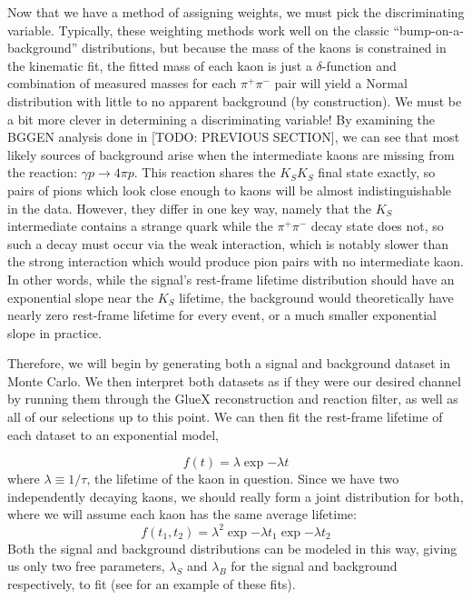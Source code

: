 Now that we have a method of assigning weights, we must pick the discriminating variable. Typically, these weighting methods work well on the classic ``bump-on-a-background'' distributions, but because the mass of the kaons is constrained in the kinematic fit, the fitted mass of each kaon is just a $\delta$-function and combination of measured masses for each $\pi^+\pi^-$ pair will yield a Normal distribution with little to no apparent background (by construction). We must be a bit more clever in determining a discriminating variable! By examining the BGGEN analysis done in {\color{red}[TODO: PREVIOUS SECTION]}, we can see that most likely sources of background arise when the intermediate kaons are missing from the reaction: $\gamma p \to 4\pi p$. This reaction shares the $K_SK_S$ final state exactly, so pairs of pions which look close enough to kaons will be almost indistinguishable in the data. However, they differ in one key way, namely that the $K_S$ intermediate contains a strange quark while the $\pi^+\pi^-$ decay state does not, so such a decay must occur via the weak interaction, which is notably slower than the strong interaction which would produce pion pairs with no intermediate kaon. In other words, while the signal's rest-frame lifetime distribution should have an exponential slope near the $K_S$ lifetime, the background would theoretically have nearly zero rest-frame lifetime for every event, or a much smaller exponential slope in practice.

Therefore, we will begin by generating both a signal and background dataset in Monte Carlo. We then interpret both datasets as if they were our desired channel by running them through the GlueX reconstruction and reaction filter, as well as all of our selections up to this point. We can then fit the rest-frame lifetime of each dataset to an exponential model,

\begin{equation}
  f(t) = \lambda \exp{-\lambda t}
  \label{eq:splot:exponential}
\end{equation}
where $\lambda \equiv 1/\tau$, the lifetime of the kaon in question. Since we have two independently decaying kaons, we should really form a joint distribution for both, where we will assume each kaon has the same average lifetime:
\begin{equation}
  f(t_1, t_2) = \lambda^2 \exp{-\lambda t_1}\exp{-\lambda t_2}
  \label{eq:splot:exponential_joint}
\end{equation}
Both the signal and background distributions can be modeled in this way, giving us only two free parameters, $\lambda_S$ and $\lambda_B$ for the signal and background respectively, to fit (see  for an example of these fits).

